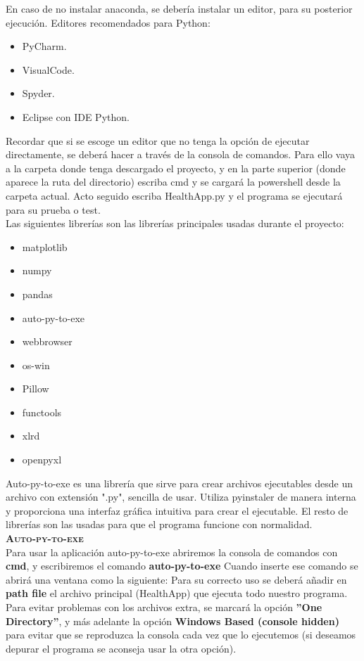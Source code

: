 En caso de no instalar anaconda, se debería instalar un editor, para su posterior ejecución. Editores recomendados para Python:
\begin{itemize}
\item PyCharm.
\item VisualCode.
\item Spyder.
\item Eclipse con IDE Python.
\end{itemize}
Recordar que si se escoge un editor que no tenga la opción de ejecutar directamente, se deberá hacer a través de la consola de comandos. Para ello vaya a la carpeta donde tenga descargado el proyecto, y en la parte superior (donde aparece la ruta del directorio) escriba cmd y se cargará la powershell desde la carpeta actual. Acto seguido escriba HealthApp.py y el programa se ejecutará para su prueba o test.\\

Las siguientes librerías son las librerías principales usadas durante el proyecto:
\begin{itemize}
\item matplotlib
\item numpy
\item pandas
\item auto-py-to-exe
\item webbrowser
\item os-win
\item Pillow
\item functools
\item xlrd
\item openpyxl
\end{itemize}
Auto-py-to-exe es una librería que sirve para crear archivos ejecutables desde un archivo con extensión ".py", sencilla de usar. Utiliza pyinstaler de manera interna y proporciona una interfaz gráfica intuitiva para crear el ejecutable. El resto de librerías son las usadas para que el programa funcione con normalidad.\\

\textbf{\textsc{Auto-py-to-exe}}\\
Para usar la aplicación auto-py-to-exe abriremos la consola de comandos con \textbf{cmd}, y escribiremos el comando \textbf{auto-py-to-exe}
Cuando inserte ese comando se abrirá una ventana como la siguiente:
Para su correcto uso se deberá añadir en \textbf{path file} el archivo principal (HealthApp) que ejecuta todo nuestro programa. Para evitar problemas con los archivos extra, se marcará la opción \textbf{''One Directory''}, y más adelante la opción \textbf{Windows Based (console hidden)} para evitar que se reproduzca la consola cada vez que lo ejecutemos (si deseamos depurar el programa se aconseja usar la otra opción).\\

